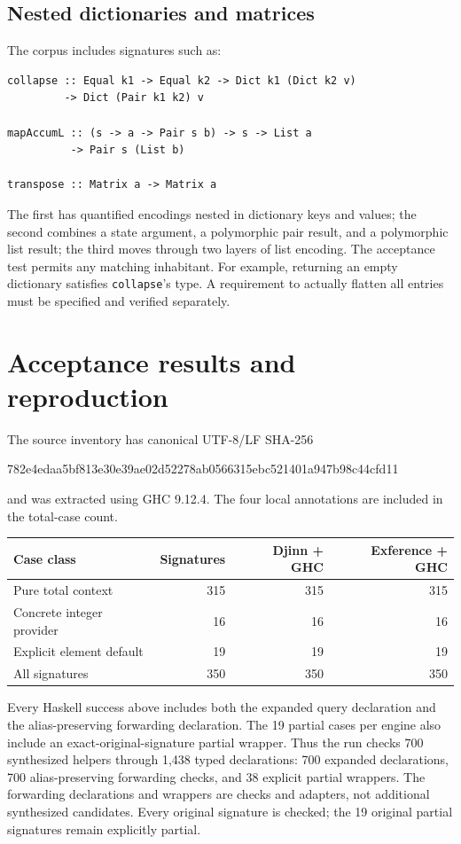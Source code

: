 \documentclass[11pt]{article}
\newcommand{\code}[1]{\texttt{#1}}
\begin{document}
\subsection{Nested dictionaries and matrices}
The corpus includes signatures such as:
\begin{lstlisting}
collapse :: Equal k1 -> Equal k2 -> Dict k1 (Dict k2 v)
         -> Dict (Pair k1 k2) v

mapAccumL :: (s -> a -> Pair s b) -> s -> List a
          -> Pair s (List b)

transpose :: Matrix a -> Matrix a
\end{lstlisting}
The first has quantified encodings nested in dictionary keys and values; the
second combines a state argument, a polymorphic pair result, and a
polymorphic list result; the third moves through two layers of list encoding.
The acceptance test permits any matching inhabitant. For example, returning
an empty dictionary satisfies \code{collapse}'s type. A requirement to
actually flatten all entries must be specified and verified separately.

\section{Acceptance results and reproduction}

The source inventory has canonical UTF-8/LF SHA-256
\begin{center}\small\ttfamily
782e4edaa5bf813e30e39ae02d52278ab0566315ebc521401a947b98c44cfd11
\end{center}
and was extracted using GHC 9.12.4. The four local annotations are included in
the total-case count.

\begin{center}
\begin{tabular}{lrrr}
\toprule
Case class & Signatures & Djinn + GHC & Exference + GHC \\
\midrule
Pure total context & 315 & 315 & 315 \\
Concrete integer provider & 16 & 16 & 16 \\
Explicit element default & 19 & 19 & 19 \\
\midrule
All signatures & 350 & 350 & 350 \\
\bottomrule
\end{tabular}
\end{center}
Every Haskell success above includes both the expanded query declaration and
the alias-preserving forwarding declaration. The 19 partial cases per engine
also include an exact-original-signature partial wrapper. Thus the run checks
700 synthesized helpers through 1,438 typed declarations: 700 expanded
declarations, 700 alias-preserving forwarding checks, and 38 explicit partial
wrappers. The forwarding declarations and wrappers are checks and adapters,
not additional synthesized candidates. Every original signature is checked;
the 19 original partial signatures remain explicitly partial.
\end{document}
